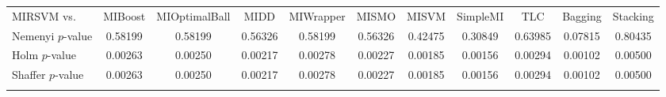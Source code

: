 \begin{table}[t!]
{}
\label{fig:BonfDunnprec}
\label{tab:statprec}
\scriptsize
\begin{tabularx}{\textwidth}{lcccccccccc}\noalign{\smallskip}\hline\noalign{\smallskip}
MIRSVM vs. & MIBoost & MIOptimalBall & MIDD & MIWrapper & MISMO & MISVM & SimpleMI & TLC & Bagging & Stacking\\
\noalign{\smallskip}\hline\noalign{\smallskip}
Nemenyi $p$-value & 0.58199 & 0.58199 & 0.56326 & 0.58199 & 0.56326 & 0.42475 & 0.30849 & 0.63985 & 0.07815 & 0.80435\\
Holm $p$-value & 0.00263 & 0.00250 & 0.00217 & 0.00278 & 0.00227 & 0.00185 & 0.00156 & 0.00294 & 0.00102 & 0.00500\\
Shaffer $p$-value & 0.00263 & 0.00250 & 0.00217 & 0.00278 & 0.00227 & 0.00185 & 0.00156 & 0.00294 & 0.00102 & 0.00500\\
\noalign{\smallskip}\hline\noalign{\smallskip}
\end{tabularx}
\end{table}
